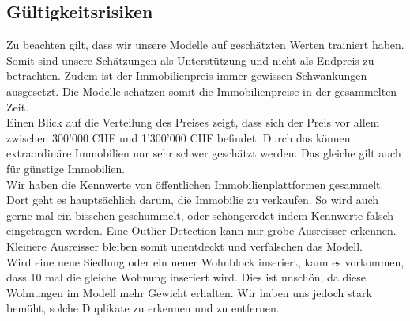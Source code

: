 \subsection{Gültigkeitsrisiken}
Zu beachten gilt, dass wir unsere Modelle auf geschätzten Werten trainiert haben. Somit sind unsere Schätzungen als Unterstützung und nicht als Endpreis zu betrachten. Zudem ist der Immobilienpreis immer gewissen Schwankungen ausgesetzt. Die Modelle schätzen somit die Immobilienpreise in der gesammelten Zeit.\\
Einen Blick auf die Verteilung des Preises zeigt, dass sich der Preis vor allem zwischen 300'000 CHF und 1'300'000 CHF befindet. Durch das können extraordinäre Immobilien nur sehr schwer geschätzt werden. Das gleiche gilt auch für günstige Immobilien.\\[2ex]
%
Wir haben die Kennwerte von öffentlichen Immobilienplattformen gesammelt. Dort geht es hauptsächlich darum, die Immobilie zu verkaufen. So wird auch gerne mal ein bisschen geschummelt, oder schöngeredet indem Kennwerte falsch eingetragen werden. Eine Outlier Detection kann nur grobe Ausreisser erkennen. Kleinere Ausreisser bleiben somit unentdeckt und verfälschen das Modell.\\
Wird eine neue Siedlung oder ein neuer Wohnblock inseriert, kann es vorkommen, dass 10 mal die gleiche Wohnung inseriert wird. Dies ist unschön, da diese Wohnungen im Modell mehr Gewicht erhalten. Wir haben uns jedoch stark bemüht, solche Duplikate zu erkennen und zu entfernen.

